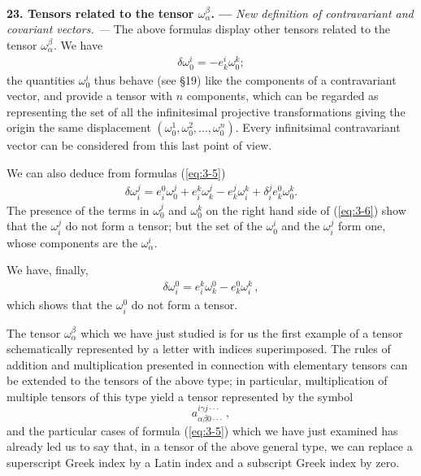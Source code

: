 
\ \\

{\bf 23. Tensors related to the tensor $\omega^\beta_\alpha$. --- }
% 
{\em New definition of contravariant and covariant vectors. ---}
The above formulas display other tensors related to the tensor $\omega^\beta_\alpha$. We have
\begin{eqnarray*}
\delta \omega^i_0 = - e^i_k \omega^k_0 ;
\end{eqnarray*}
the quantities $\omega^i_0$ thus behave (see \S 19) like the components of a contravariant vector, and provide a tensor with $n$ components, which can be regarded as representing the set of all the infinitesimal projective transformations giving the origin the same displacement $(\omega^1_0, \omega^2_0, ..., \omega^n_0)$. Every infinitsimal contravariant vector can be considered from this last point of view. 

We can also deduce from formulas (\ref{eq:3-5}) 
\begin{eqnarray}
\delta \omega^j_i = e^0_i \omega^j_0 + e^k_i  \omega^j_k - e^j_k  \omega^k_i + \delta^j_i e^0_k \omega^k_0 .
\label{eq:3-6}
\end{eqnarray}
The presence of the terms in $\omega^j_0$ and $\omega^k_0$ on the right hand side of (\ref{eq:3-6}) show that the $\omega^j_i$ do not form a tensor; but the set of the $\omega^i_0$ and the $\omega^j_i$ form one, whose components are the $\omega^i_\alpha$. 

We have, finally, 
\begin{eqnarray*}
\delta \omega^0_i =  e^k_i \omega^0_k - e^0_k \omega^k_i \, ,
\end{eqnarray*}
which shows that the $\omega^0_i$ do not form a tensor. 

The tensor $\omega^\beta_\alpha$ which we have just studied is for us the first example of a tensor schematically represented by a letter with indices superimposed. The rules of addition and multiplication presented in connection with elementary tensors can be extended to the tensors of the above type; in particular, multiplication of multiple tensors of this type yield a tensor represented by the symbol
  $$ a^{i \gamma j \cdot \cdot \cdot}_{\alpha \beta 0 \cdot\cdot\cdot} \, , $$
and the particular cases of formula (\ref{eq:3-5}) which we have just examined has already led us to say that, in a tensor of  the above general type, we can replace a superscript Greek index by a Latin index and a subscript Greek index by zero.

